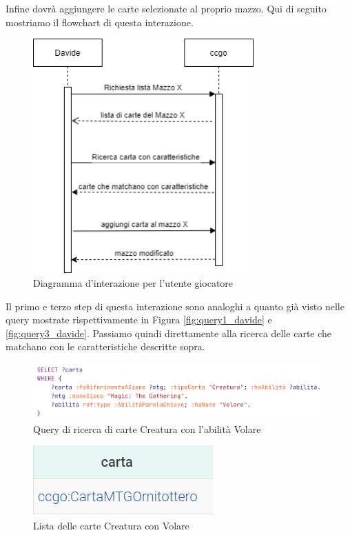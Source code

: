 \documentclass[12pt]{article}
\begin{document}
Infine dovrà aggiungere le carte selezionate al proprio mazzo.
Qui di seguito mostriamo il flowchart di questa interazione.

\begin{figure}[H]
    \centering
    \includegraphics[height=9cm]{files/flowchart_davide_ricerca_carta.png}
    \caption{Diagramma d'interazione per l'utente giocatore}
    \label{fig:flowchart_davide_ric_carta}
\end{figure}

Il primo e terzo step di questa interazione sono analoghi a quanto già visto nelle query mostrate rispettivamente in Figura \ref{fig:query1_davide} e \ref{fig:query3_davide}. Passiamo quindi direttamente alla ricerca delle carte che matchano con le caratteristiche descritte sopra.

\begin{figure}[H]
    \centering
    \includegraphics[width=14cm]{files/query4_davide.png}
    \caption{Query di ricerca di carte Creatura con l'abilità Volare}
    \label{fig:query4_davide}
\end{figure}

\begin{figure}[H]
    \centering
    \includegraphics[]{files/res4_davide.png}
    \caption{Lista delle carte Creatura con Volare}
    \label{fig:res4_davide}
\end{figure}
\end{document}

